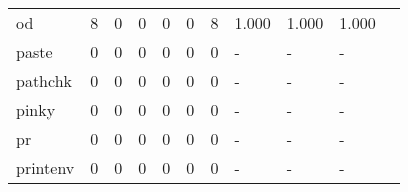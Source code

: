 \begin{longtable}{lp{1.2cm}p{1.2cm}p{1.2cm}p{1.2cm}p{1.2cm}p{1.2cm}p{1.2cm}p{1.2cm}p{1.2cm}p{1.2cm}}
od        &                                     8 &                                                  0 &                                                  0 &                                                  0 &                                                  0 &                                                  8 &                                              1.000 &                                              1.000 &                                              1.000 \\
paste     &                                     0 &                                                  0 &                                                  0 &                                                  0 &                                                  0 &                                                  0 &                                                  - &                                                  - &                                                  - \\
pathchk   &                                     0 &                                                  0 &                                                  0 &                                                  0 &                                                  0 &                                                  0 &                                                  - &                                                  - &                                                  - \\
pinky     &                                     0 &                                                  0 &                                                  0 &                                                  0 &                                                  0 &                                                  0 &                                                  - &                                                  - &                                                  - \\
pr        &                                     0 &                                                  0 &                                                  0 &                                                  0 &                                                  0 &                                                  0 &                                                  - &                                                  - &                                                  - \\
printenv  &                                     0 &                                                  0 &                                                  0 &                                                  0 &                                                  0 &                                                  0 &                                                  - &                                                  - &                                                  - \\

\end{longtable}
